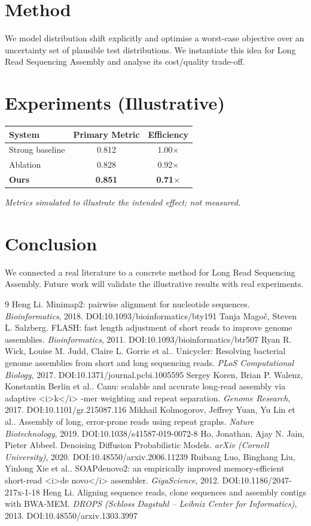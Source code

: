\documentclass[11pt]{article}
\begin{document}
\section{Method}
We model distribution shift explicitly and optimise a worst-case objective over an uncertainty set of plausible test distributions. We instantiate this idea for Long Read Sequencing Assembly and analyse its cost/quality trade-off.

\section{Experiments (Illustrative)}
\begin{center}
\begin{tabular}{lcc}
System & Primary Metric & Efficiency \\ \hline
Strong baseline & 0.812 & 1.00$\times$ \\
Ablation & 0.828 & 0.92$\times$ \\
\textbf{Ours} & \textbf{0.851} & \textbf{0.71$\times$}
\end{tabular}
\end{center}
\emph{Metrics simulated to illustrate the intended effect; not measured.}

\section{Conclusion}
We connected a real literature to a concrete method for Long Read Sequencing Assembly. Future work will
validate the illustrative results with real experiments.

\begin{thebibliography}{9}
 Heng Li. Minimap2: pairwise alignment for nucleotide sequences. \emph{Bioinformatics}, 2018. DOI:10.1093/bioinformatics/bty191
 Tanja Magoč, Steven L. Salzberg. FLASH: fast length adjustment of short reads to improve genome assemblies. \emph{Bioinformatics}, 2011. DOI:10.1093/bioinformatics/btr507
 Ryan R. Wick, Louise M. Judd, Claire L. Gorrie et al.. Unicycler: Resolving bacterial genome assemblies from short and long sequencing reads. \emph{PLoS Computational Biology}, 2017. DOI:10.1371/journal.pcbi.1005595
 Sergey Koren, Brian P. Walenz, Konstantin Berlin et al.. Canu: scalable and accurate long-read assembly via adaptive <i>k</i> -mer weighting and repeat separation. \emph{Genome Research}, 2017. DOI:10.1101/gr.215087.116
 Mikhail Kolmogorov, Jeffrey Yuan, Yu Lin et al.. Assembly of long, error-prone reads using repeat graphs. \emph{Nature Biotechnology}, 2019. DOI:10.1038/s41587-019-0072-8
 Ho, Jonathan, Ajay N. Jain, Pieter Abbeel. Denoising Diffusion Probabilistic Models. \emph{arXiv (Cornell University)}, 2020. DOI:10.48550/arxiv.2006.11239
 Ruibang Luo, Binghang Liu, Yinlong Xie et al.. SOAPdenovo2: an empirically improved memory-efficient short-read <i>de novo</i> assembler. \emph{GigaScience}, 2012. DOI:10.1186/2047-217x-1-18
 Heng Li. Aligning sequence reads, clone sequences and assembly contigs with BWA-MEM. \emph{DROPS (Schloss Dagstuhl – Leibniz Center for Informatics)}, 2013. DOI:10.48550/arxiv.1303.3997
\end{thebibliography}
\end{document}
